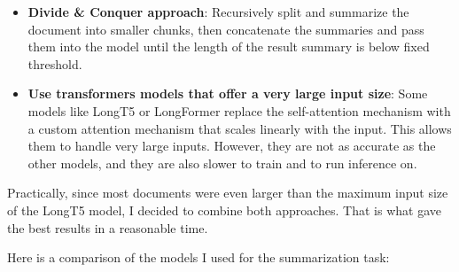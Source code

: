 \begin{itemize}
    \item \textbf{Divide \& Conquer approach}: Recursively split and summarize the document into smaller chunks, then concatenate the summaries and pass them into the model until the length of the result summary is below fixed threshold.

    \item \textbf{Use transformers models that offer a very large input size}: Some models like LongT5 or LongFormer replace the self-attention mechanism with a custom attention mechanism that scales linearly with the input. This allows them to handle very large inputs. However, they are not as accurate as the other models, and they are also slower to train and to run inference on.
\end{itemize}

Practically, since most documents were even larger than the maximum input size of the LongT5 model, I decided to combine both approaches. That is what gave the best results in a reasonable time.

Here is a comparison of the models I used for the summarization task:


